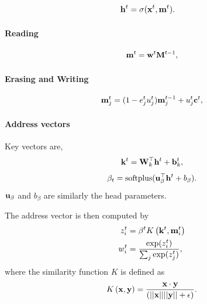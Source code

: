 \documentclass[landscape,a0paper,fontscale=0.285,final]{baposter} %
\begin{document}
\begin{poster}
{\begin{align}
    \mathbf{h}^t &= \sigma(\mathbf{x}^t, \mathbf{m}^t).
\end{align}


\paragraph{Reading}
\begin{align}
    \label{eq:read_with_attention}
    \mathbf{m}^t =  \mathbf{w}^t \mathbf{M}^{t-1},
\end{align}

\paragraph{Erasing and Writing}

\begin{align}
\label{eq:write_with_attention}
\mathbf{m}^{t}_j = (1 - e^t_j u^t_j) \mathbf{m}^{t-1}_j + u^t_j \mathbf{c}^{t},
\end{align}
\paragraph{Address vectors}
Key vectors are,
\[
    \mathbf{k}^t = \mathbf{W}^\top_k \mathbf{h}^t + \mathbf{b}^t_k,
\]
\[
    \beta_t = \text{softplus}(\mathbf{u}_{\beta}^{\top} \mathbf{h}^t + b_{\beta}).
\]
$\mathbf{u}_{\beta}$ and $b_{\beta}$ are similarly the head parameters.

The address vector is then computed by
\begin{align}
    \label{eq:softmax}
    z_i^t & = \beta^t K\left(\mathbf{k}^t, \mathbf{m}^t_i\right) \\
    w_i^t &= \frac{
        \exp( z_i^t)
    }
    {
        \sum_j \exp( z_j^t )
    },
\end{align}
where the similarity function $K$ is defined as
\[
    K\left(\mathbf{x}, \mathbf{y}\right) = \frac{\mathbf{x} \cdot \mathbf{y}}{(||\mathbf{x}||||\mathbf{y}|| + \epsilon)}.
\]
}

\end{poster}
\end{document}
